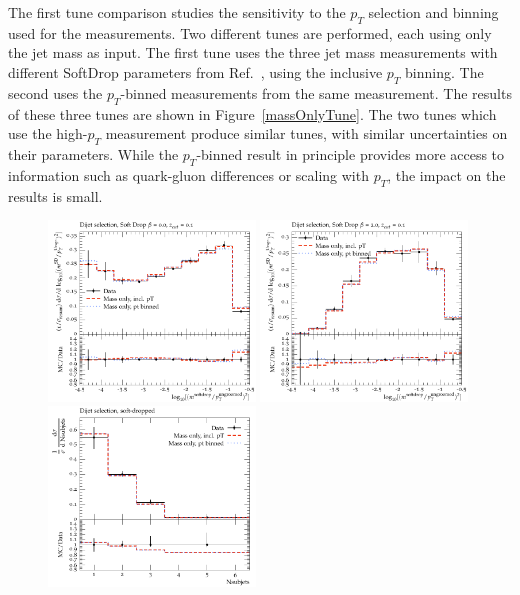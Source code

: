The first tune comparison studies the sensitivity to the $p_T$ selection and binning used for the measurements. Two different tunes are performed, each using only the jet mass as input.
The first tune uses the three jet mass measurements with different SoftDrop parameters from Ref.~\cite{Aaboud:2017qwh}, using the inclusive $p_T$ binning. 
The second uses the $p_T$-binned measurements from the same measurement. 
The results of these three tunes are shown in Figure~\ref{massOnlyTune}. 
The two tunes which use the high-$p_T$ measurement produce similar tunes, with similar uncertainties on their parameters. 
While the $p_T$-binned result in principle provides more access to information such as quark-gluon differences or scaling with $p_T$, the impact on the results is small. 


\begin{figure}
\begin{center}
\includegraphics[width=0.49\textwidth]{figs/RivetPlotsMassOnly/SoftDropMass/d01-x01-y01.pdf} \hfill
\includegraphics[width=0.49\textwidth]{figs/RivetPlotsMassOnly/SoftDropMass/d03-x01-y01.pdf} \hfill
\includegraphics[width=0.49\textwidth]{figs/RivetPlotsMassOnly/ATLAS_2019_I1724098/d23-x01-y01.pdf} \hfill

\end{center}
\end{figure}
